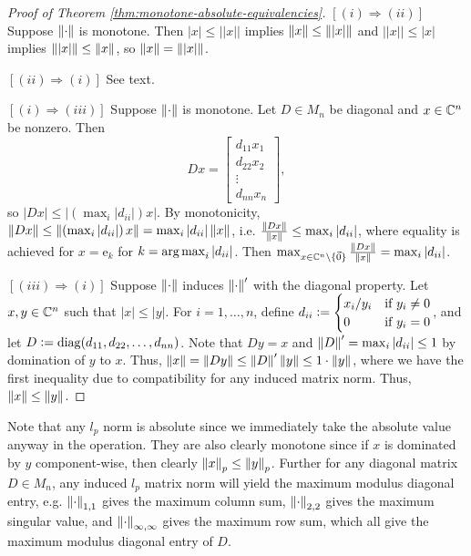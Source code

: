 \begin{proof}[Proof of Theorem \ref{thm:monotone-absolute-equivalencies}]
$[(i) \Longrightarrow (ii)]$ Suppose $\left\lVert\cdot\right\rVert$ is monotone. Then $|x| \le \Big| |x| \Big|$ implies $\left\lVert x\right\rVert \le \left\lVert|x|\right\rVert$ and $\Big| |x| \Big| \le |x|$ implies $\left\lVert|x|\right\rVert \le \left\lVert x\right\rVert$, so $\left\lVert x\right\rVert = \left\lVert|x|\right\rVert$. 

\noindent $[(ii) \Longrightarrow (i)]$ See text. 

\noindent $[(i) \Longrightarrow (iii)]$ Suppose $\left\lVert\cdot\right\rVert$ is monotone. Let $D \in M_n$ be diagonal and $x \in \mathbb C^n$ be nonzero. Then
\[
    Dx = \begin{bmatrix}
    d_{11}x_1 \\ d_{22}x_2 \\ \vdots \\ d_{nn}x_n
    \end{bmatrix},
\]
so $|Dx| \le \left|\left(\max_i |d_{ii}|\right)x\right|$. By monotonicity, $\left\lVert Dx\right\rVert \le \left\lVert\left(\max_i |d_{ii}|\right)x\right\rVert = \max_{i}|d_{ii}|\left\lVert x\right\rVert$, i.e. $\frac{\left\lVert Dx\right\rVert}{\left\lVert x\right\rVert} \le \max_i|d_{ii}|$, where equality is achieved for $x = \textrm{e}_k$ for $k = \operatorname*{arg\,max}_i |d_{ii}|$. Then $\max_{x\in\mathbb C^n\setminus\{\Vec{0}\}} \frac{\left\lVert Dx\right\rVert}{\left\lVert x\right\rVert} = \max_i|d_{ii}|$.

\noindent $[(iii) \Longrightarrow (i)]$ Suppose $\left\lVert\cdot\right\rVert$ induces $\left\lVert\cdot\right\rVert'$ with the diagonal property. Let $x,y \in \mathbb C^n$ such that $|x| \le |y|$. For $i = 1, \dots, n$, define $d_{ii} \vcentcolon= \begin{cases}x_i/y_i & \text{if }y_i\not=0 \\ 0 & \textrm{if } y_i = 0\end{cases}$, and let $D \vcentcolon= \operatorname{diag}(d_{11},d_{22}, \dots, d_{nn})$. Note that $Dy=x$ and $\left\lVert D\right\rVert' = \max_i |d_{ii}| \le 1 $ by domination of $y$ to $x$. Thus, $\left\lVert x\right\rVert = \left\lVert Dy\right\rVert \le \left\lVert D\right\rVert'\left\lVert y\right\rVert \le 1 \cdot \left\lVert y\right\rVert$, where we have the first inequality due to compatibility for any induced matrix norm. Thus, $\left\lVert x\right\rVert \le \left\lVert y\right\rVert$.
\end{proof} 

\begin{example}
Note that any $l_p$ norm is absolute since we immediately take the absolute value anyway in the operation. They are also clearly monotone since if $x$ is dominated by $y$ component-wise, then clearly $\left\lVert x\right\rVert_p \le \left\lVert y\right\rVert_p$. Further for any diagonal matrix $D \in M_n$, any induced $l_p$ matrix norm will yield the maximum modulus diagonal entry, e.g. $\left\lVert\cdot\right\rVert_{1,1}$ gives the maximum column sum, $\left\lVert\cdot\right\rVert_{2,2}$ gives the maximum singular value, and $\left\lVert\cdot\right\rVert_{\infty, \infty}$ gives the maximum row sum, which all give the maximum modulus diagonal entry of $D$.
\end{example}

